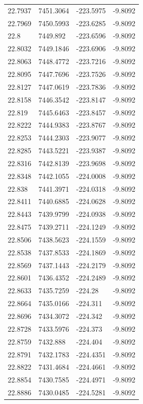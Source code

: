 \begin{table}[H]
\begin{tabular}{llll}
22.7937 & 7451.3064 & -223.5975 & -9.8092 \\
22.7969 & 7450.5993 & -223.6285 & -9.8092 \\
22.8 & 7449.892 & -223.6596 & -9.8092 \\
22.8032 & 7449.1846 & -223.6906 & -9.8092 \\
22.8063 & 7448.4772 & -223.7216 & -9.8092 \\
22.8095 & 7447.7696 & -223.7526 & -9.8092 \\
22.8127 & 7447.0619 & -223.7836 & -9.8092 \\
22.8158 & 7446.3542 & -223.8147 & -9.8092 \\
22.819 & 7445.6463 & -223.8457 & -9.8092 \\
22.8222 & 7444.9383 & -223.8767 & -9.8092 \\
22.8253 & 7444.2303 & -223.9077 & -9.8092 \\
22.8285 & 7443.5221 & -223.9387 & -9.8092 \\
22.8316 & 7442.8139 & -223.9698 & -9.8092 \\
22.8348 & 7442.1055 & -224.0008 & -9.8092 \\
22.838 & 7441.3971 & -224.0318 & -9.8092 \\
22.8411 & 7440.6885 & -224.0628 & -9.8092 \\
22.8443 & 7439.9799 & -224.0938 & -9.8092 \\
22.8475 & 7439.2711 & -224.1249 & -9.8092 \\
22.8506 & 7438.5623 & -224.1559 & -9.8092 \\
22.8538 & 7437.8533 & -224.1869 & -9.8092 \\
22.8569 & 7437.1443 & -224.2179 & -9.8092 \\
22.8601 & 7436.4352 & -224.2489 & -9.8092 \\
22.8633 & 7435.7259 & -224.28 & -9.8092 \\
22.8664 & 7435.0166 & -224.311 & -9.8092 \\
22.8696 & 7434.3072 & -224.342 & -9.8092 \\
22.8728 & 7433.5976 & -224.373 & -9.8092 \\
22.8759 & 7432.888 & -224.404 & -9.8092 \\
22.8791 & 7432.1783 & -224.4351 & -9.8092 \\
22.8822 & 7431.4684 & -224.4661 & -9.8092 \\
22.8854 & 7430.7585 & -224.4971 & -9.8092 \\
22.8886 & 7430.0485 & -224.5281 & -9.8092 \\

\end{tabular}
\end{table}
